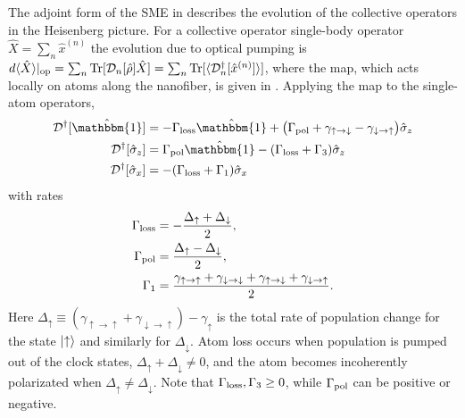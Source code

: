 \documentclass[preprint,aps,pra,onecolumn]{revtex4-1} %
\newcommand{\gammauu}{\gamma_{\uparrow \rightarrow \uparrow}}
\newcommand{\gammadd}{\gamma_{\downarrow \rightarrow \downarrow}}
\newcommand{\gammaud}{\gamma_{\uparrow \rightarrow \downarrow}}
\newcommand{\gammadu}{\gamma_{\downarrow \rightarrow \uparrow}}
\newcommand{\gammap}{\tilde{\gamma}_\uparrow + \tilde{\gamma}_\downarrow}
\newcommand{\gammam}{\tilde{\gamma}_\uparrow - \tilde{\gamma}_\downarrow}
\newcommand{\xrate}{\Gamma_{1}}
\newcommand{\lrate}{\Gamma_{\rm loss}}
\newcommand{\prate}{\Gamma_{\rm pol}}
\newcommand{\zrateA}{\tilde{\Gamma}}
\newcommand{\zrateB}{\Gamma_{?}}
\newcommand{\zrate}{\Gamma_{3}}
\begin{document}
\begin{appendix}
The adjoint form of the SME in  describes the evolution of the collective operators in the Heisenberg picture. For a collective operator single-body operator $\hat{X} = \sum_n \hat{x}^{(n)}$ the evolution due to optical pumping is $d\langle{ \hat{X}}\rangle|_{\rm op} = \sum_n \mbox{Tr} [\mathcal{D}_n[\hat{\rho}]\hat{X} ] = \sum_n \mbox{Tr} [\langle{\mathcal{D}_n^\dagger[\hat{x}^{(n)}]}\rangle ] $, where the map, which acts locally on atoms along the nanofiber, is given in . Applying the map to the single-atom operators, 
	\begin{align}
		\mathcal{D}\dg[\hat{\mathbbm{1}}] & = - \lrate \hat{\mathbbm{1}} + \big( \prate + \gammaud - \gammadu \big)\hat{\sigma}_z \label {Eq::Idecay} \\
		\mathcal{D}\dg[\hat{\sigma}_z] & = \prate \hat{\mathbbm{1}} - ( \lrate + \zrate ) \hat{\sigma}_z \label{Eq::zdecay} \\
		\mathcal{D}\dg[\hat{\sigma}_x] & = - (\lrate + \xrate ) \hat{\sigma}_x 
	\end{align}
with rates	
	\begin{align}
		\lrate %
			& = - \frac{\Delta_\uparrow + \Delta_{\downarrow}}{2} , \label{Eq::lrate} \\
		\prate  %
			& = \frac{\Delta_\uparrow - \Delta_{\downarrow}}{2} , \label{Eq::prate} \\
		\xrate & =  \frac{\gammauu + \gammadd + \gammaud + \gammadu}{2}. \label{Eq::frate}
	\end{align}
Here $\Delta_\uparrow \equiv (\gammauu + \gammadu ) - \gamma_\uparrow$ is the total rate of population change for the state $\lvert{\uparrow}\rangle$ and similarly for $\Delta_\downarrow$. Atom loss occurs when population is pumped out of the clock states, $\Delta_\uparrow + \Delta_\downarrow \neq 0$, and the atom becomes incoherently polarizated when $\Delta_\uparrow \neq \Delta_\downarrow$. Note that $\lrate, \zrate \ge 0$, while $\prate$ can be positive or negative.


\end{appendix}
\end{document}
